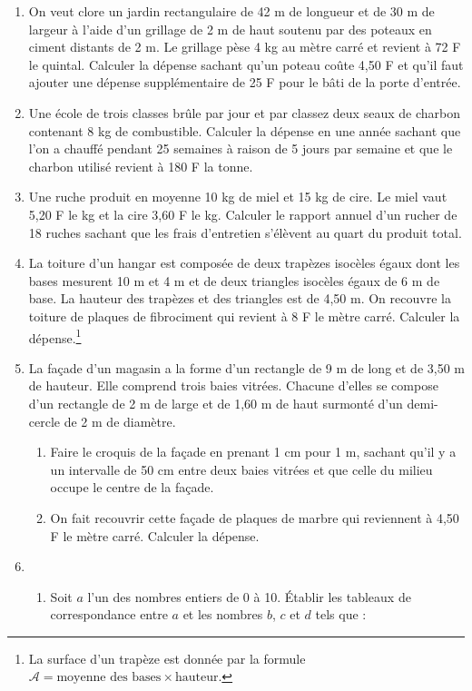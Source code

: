 \documentclass[12 pt]{report}
\theoremstyle{plain}
\newcounter{n}
\begin{document}
\begin{enumerate}
 \item On veut clore un jardin rectangulaire de 42 m de longueur et de 30 m de largeur à l'aide d'un grillage de 2 m de haut soutenu par des poteaux en 
 ciment distants de 2 m. Le grillage pèse 4 kg au mètre carré et revient à 72 F le quintal. Calculer la dépense sachant qu'un poteau coûte 4,50 F et qu'il faut ajouter une dépense supplémentaire de 25 F pour 
 le bâti de la porte d'entrée.
 \item Une école de trois classes brûle par jour et par classez deux seaux de charbon contenant 8 kg de 
 combustible. Calculer la dépense en une année sachant
 que l'on a chauffé pendant 25 semaines à raison de 
 5 jours par semaine et que le charbon utilisé revient à 180 F la tonne. 
 \item Une ruche produit en moyenne 10 kg de miel et 15 kg de cire. Le miel vaut 5,20 F le kg et la cire 3,60 F le kg. Calculer le rapport annuel d'un rucher 
 de 18 ruches sachant que les frais d'entretien s'élèvent au quart du produit total. 
 \item La toiture d'un hangar est composée de deux 
 trapèzes isocèles égaux dont les bases mesurent 
 10 m et 4 m et de deux triangles isocèles égaux de 6 m de base. La hauteur des trapèzes et des triangles est de 4,50 m. On recouvre la toiture de plaques de 
 fibrociment qui revient à 8 F le mètre carré. Calculer la dépense.\footnote{La surface d'un trapèze est donnée par la formule $\mathcal A = \text{moyenne des bases}\times \text{hauteur}$.}
 \item La façade d'un magasin a la forme d'un rectangle de 9 m de long et de 3,50 m de hauteur. Elle
 comprend trois baies vitrées. Chacune d'elles se compose d'un rectangle de 2 m de large et de 1,60 m de haut surmonté d'un demi-cercle de 2 m de diamètre. 
 \begin{enumerate}
 \item Faire le croquis de la façade en prenant 1 cm 
 pour 1 m, sachant qu'il y a un intervalle de 50 cm
 entre deux baies vitrées et que celle du milieu occupe le centre de la façade. 
 \item On fait recouvrir cette façade de plaques de marbre qui reviennent à 4,50 F le mètre carré. Calculer la dépense. 
 \end{enumerate}
\item \begin{enumerate}
\item Soit $a$ l'un des nombres entiers de 0 à 10. 
Établir les tableaux de correspondance entre $a$ et 
les nombres $b$, $c$ et $d$ tels que : 

\end{enumerate}
\end{enumerate}
\end{document}
